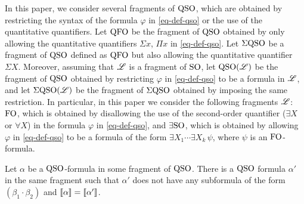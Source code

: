 In this paper, we consider several fragments of ${\rm QSO}$, which are obtained by restricting the syntax of the formula $\varphi$ in \eqref{eq-def-qso} or the use of the quantitative quantifiers. Let ${\rm QFO}$ be the fragment of ${\rm QSO}$ obtained by only allowing the quantitative quantifiers $\Sigma x$, $\Pi x$ in \eqref{eq-def-qso}. Let $\Sigma{\rm QSO}$ be a fragment of ${\rm QSO}$ defined as ${\rm QFO}$ but also allowing the quantitative quantifier $\Sigma X$. Moreover, assuming that $\mathscr{L}$ is a fragment of ${\rm SO}$, let ${\rm QSO}(\mathscr{L})$ be the fragment of ${\rm QSO}$ obtained by restricting $\varphi$ in \eqref{eq-def-qso} to be a formula in $\mathscr{L}$, and let $\Sigma{\rm QSO}(\mathscr{L})$ be the fragment of $\Sigma{\rm QSO}$ obtained by imposing the same restriction. In particular, in this paper we consider the following fragments $\mathscr{L}$: ${\rm FO}$, which is obtained by disallowing the use of the second-order quantifier ($\exists X$ or $\forall X$) in the formula $\varphi$ in \eqref{eq-def-qso}, and $\exists{\rm SO}$, which is obtained by allowing $\varphi$ in \eqref{eq-def-qso} to be a formula of the form $\exists X_1 \cdots \exists X_k \, \psi$, where $\psi$ is an ${\rm FO}$-formula. 

\begin{theorem} \label{no-mult}
	Let $\alpha$ be a ${\rm QSO}$-formula in some fragment of ${\rm QSO}$. There is a ${\rm QSO}$ formula $\alpha'$ in the same fragment such that $\alpha'$ does not have any subformula of the form $(\beta_1 \cdot \beta_2)$ and ${\llbracket{}{\alpha}\rrbracket} = {\llbracket{}{\alpha'}\rrbracket}$.
\end{theorem}
